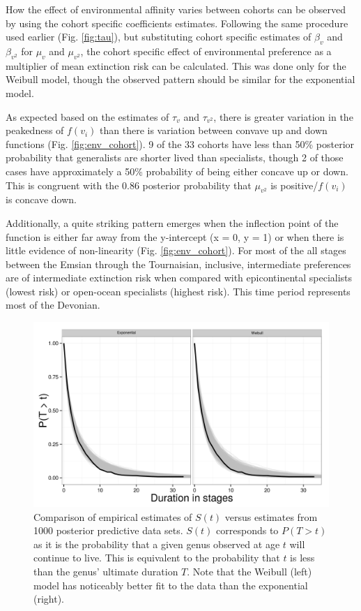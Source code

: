 \documentclass[12pt,letterpaper]{article}
\begin{document}
How the effect of environmental affinity varies between cohorts can be observed by using the cohort specific coefficients estimates. Following the same procedure used earlier (Fig. \ref{fig:tau}), but substituting cohort specific estimates of \(\beta_{v}\) and \(\beta_{v^{2}}\) for \(\mu_{v}\) and \(\mu_{v^{2}}\), the cohort specific effect of environmental preference as a multiplier of mean extinction risk can be calculated. This was done only for the Weibull model, though the observed pattern should be similar for the exponential model. 

As expected based on the estimates of \(\tau_{v}\) and \(\tau_{v^{2}}\), there is greater variation in the peakedness of \(f(v_{i})\) than there is variation between convave up and down functions (Fig. \ref{fig:env_cohort}). 9 of the 33 cohorts have less than 50\% posterior probability that generalists are shorter lived than specialists, though 2 of those cases have approximately a 50\% probability of being either concave up or down. This is congruent with the 0.86 posterior probability that \(\mu_{v^{2}}\) is positive/\(f(v_{i})\) is concave down.

Additionally, a quite striking pattern emerges when the inflection point of the function is either far away from the y-intercept (x = 0, y = 1) or when there is little evidence of non-linearity (Fig. \ref{fig:env_cohort}). For most of the all stages between the Emsian through the Tournaisian, inclusive, intermediate preferences are of intermediate extinction risk when compared with epicontinental specialists (lowest risk) or open-ocean specialists (highest risk). This time period represents most of the Devonian.

\begin{figure}[ht]
  \centering
  \includegraphics[height = 0.5\textheight,width=\textwidth,keepaspectratio=true]{figure/survival_curves}
  \caption{Comparison of empirical estimates of \(S(t)\) versus estimates from 1000 posterior predictive data sets. \(S(t)\) corresponds to \(P(T > t)\) as it is the probability that a given genus observed at age \(t\) will continue to live. This is equivalent to the probability that \(t\) is less than the genus' ultimate duration \(T\). Note that the Weibull (left) model has noticeably better fit to the data than the exponential (right).}
  \label{fig:surv}
\end{figure}
\end{document}
